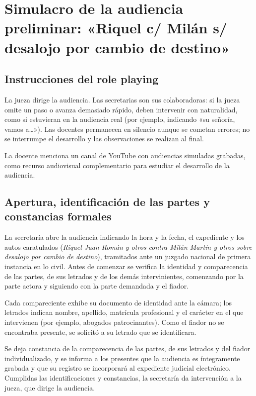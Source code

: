 \documentclass[12pt,oneside]{book}
\begin{document}
\chapter[Simulacro de la audiencia preliminar]{Simulacro de la audiencia preliminar: «Riquel c/ Milán s/ desalojo por cambio de destino»}

\section{Instrucciones del role playing}

La jueza dirige la audiencia. Las secretarias son sus colaboradoras: si la jueza omite un paso o avanza demasiado rápido, deben intervenir con naturalidad, como si estuvieran en la audiencia real (por ejemplo, indicando «su señoría, vamos a\ldots»). Las docentes permanecen en silencio aunque se cometan errores; no se interrumpe el desarrollo y las observaciones se realizan al final.

\begin{note}
La docente menciona un canal de YouTube con audiencias simuladas grabadas, como recurso audiovisual complementario para estudiar el desarrollo de la audiencia.
\end{note}

\section{Apertura, identificación de las partes y constancias formales}

La secretaría abre la audiencia indicando la hora y la fecha, el expediente y los autos caratulados (\textit{Riquel Juan Román y otros contra Milán Martín y otros sobre desalojo por cambio de destino}), tramitados ante un juzgado nacional de primera instancia en lo civil. Antes de comenzar se verifica la identidad y comparecencia de las partes, de sus letrados y de los demás intervinientes, comenzando por la parte actora y siguiendo con la parte demandada y el fiador.

Cada compareciente exhibe su documento de identidad ante la cámara; los letrados indican nombre, apellido, matrícula profesional y el carácter en el que intervienen (por ejemplo, abogados patrocinantes). Como el fiador no se encontraba presente, se solicitó a su letrado que se identificara.

Se deja constancia de la comparecencia de las partes, de sus letrados y del fiador individualizado, y se informa a los presentes que la audiencia es íntegramente grabada y que su registro se incorporará al expediente judicial electrónico. Cumplidas las identificaciones y constancias, la secretaría da intervención a la jueza, que dirige la audiencia.
\end{document}
